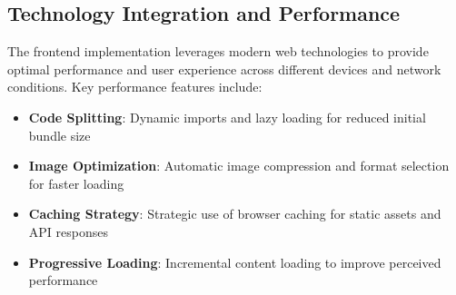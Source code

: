 \subsection{Technology Integration and Performance}
The frontend implementation leverages modern web technologies to provide optimal performance and user experience across different devices and network conditions. Key performance features include:
\begin{itemize}
    \item \textbf{Code Splitting}: Dynamic imports and lazy loading for reduced initial bundle size
    \item \textbf{Image Optimization}: Automatic image compression and format selection for faster loading
    \item \textbf{Caching Strategy}: Strategic use of browser caching for static assets and API responses
    \item \textbf{Progressive Loading}: Incremental content loading to improve perceived performance
\end{itemize}